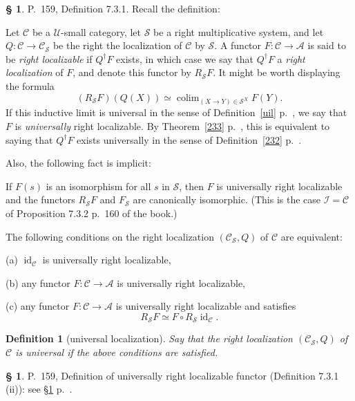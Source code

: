 \documentclass[12pt]{article}
\newtheorem{df}[thm]{Definition}
\theoremstyle{remark}
\theoremstyle{definition}
\newtheorem{s}[thm]{\S}
\newcommand{\nn}{\noindent}
\newcommand{\cc}{\mathcal}
\newcommand{\A}{\mathcal A}
\newcommand{\C}{\mathcal C}
\newcommand{\U}{\mathcal U}
\DeclareMathOperator*{\colim}{colim}
\DeclareMathOperator{\id}{id}
\begin{document}
\begin{s}\label{durl} 
P.~159, Definition 7.3.1. Recall the definition: 

Let $\C$ be a $\U$-small category, let $\cc S$ be a right multiplicative system, and let $Q:\C\to\C_{\cc S}$ be the right the localization of $\C$ by $\cc S$. A functor $F:\C\to\A$ is said to be {\em right localizable} if $Q^\dagger F$ exists, in which case we say that $Q^\dagger F$ a {\em right localization} of $F$, and denote this functor by $R_{\cc S}F$. It might be worth displaying the formula 
$$
(R_{\cc S}F)(Q(X))\simeq\colim_{(X\to Y)\in\cc S^X}F(Y).
$$ 
If this inductive limit is universal in the sense of Definition~\ref{uil} p.~\pageref{uil}, we say that $F$ is {\em universally} right localizable.  By Theorem~\ref{233} p.~\pageref{233}, this is equivalent to saying that $Q^\dagger F$ exists universally in the sense of Definition~\ref{232} p.~\pageref{232}. 

Also, the following fact is implicit:

If $F(s)$ is an isomorphism for all $s$ in $\cc S$, then $F$ is universally right localizable and the functors $R_{\cc S}F$ and $F_{\cc S}$ are canonically isomorphic. (This is the case $\cc I=\C$ of Proposition 7.3.2 p.~160 of the book.)

The following conditions on the right localization $(\C_{\cc S},Q)$ of $\C$ are equivalent: 

\nn(a) $\id_\C$ is universally right localizable, 

\nn(b) any functor $F:\C\to\A$ is universally right localizable, 

\nn(c) any functor $F:\C\to\A$ is universally right localizable and satisfies 
$$
R_{\cc S}F\simeq F\circ R_{\cc S}\id_\C.
$$

\begin{df}[universal localization]\label{url2} 
Say that the right localization $(\C_{\cc S},Q)$ of $\C$ is {\em universal} if the above conditions are satisfied.
\end{df}
\end{s}

%

\begin{s}
P.~159, Definition of universally right localizable functor (Definition 7.3.1 (ii)): see \S\ref{durl} p.~\pageref{durl}. 
\end{s}

%
\end{document}
